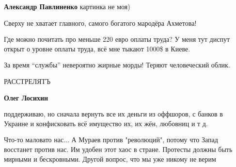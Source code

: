 \begin{itemize}
\textbf{Александр Павлиненко} картинка не моя)

Сверху не хватает главного, самого богатого мародёра Ахметова!

Где можно почитать про меньше 220 евро оплаты труда? У меня тут диспут открыт о уровне оплаты труда, всё мне тыкают 1000\$ в Киеве.

За время \enquote{службы} невероятно жирные морды! Теряют человеческий облик.


РАССТРЕЛЯТЪ

\textbf{Олег Лосихин} 

поддерживаю, но сначала вернуть все их деньги из оффшоров, с банков в Украине и
конфисковать всё имущество их, их жён, любовниц и т д.


Что-то маловато нас... А Мураев против "революций", потому что Запад восстанет
против нас. Им удобен этот хаос в стране. Протесты должны быть мирными и
бескровными. Другой вопрос, что мы уже никому не верим

\end{itemize} %
